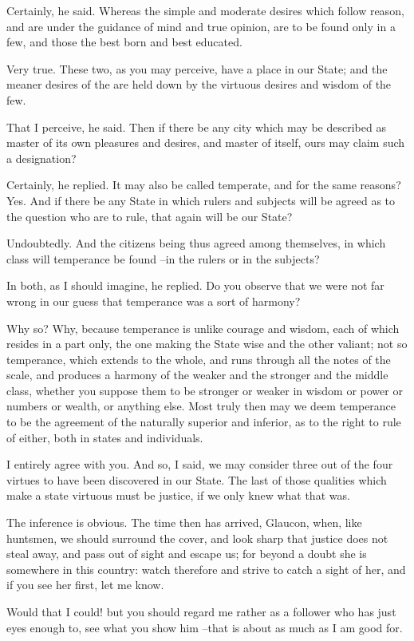 Certainly, he said.
Whereas the simple and moderate desires which follow reason, and are under the guidance of mind and true opinion, are to be found only in a few, and those the best born and best educated.

Very true. These two, as you may perceive, have a place in our State; and the meaner desires of the are held down by the virtuous desires and wisdom of the few.

That I perceive, he said.
Then if there be any city which may be described as master of its own pleasures and desires, and master of itself, ours may claim such a designation?

Certainly, he replied.
It may also be called temperate, and for the same reasons?
Yes.
And if there be any State in which rulers and subjects will be agreed as to the question who are to rule, that again will be our State?

Undoubtedly.
And the citizens being thus agreed among themselves, in which class will temperance be found --in the rulers or in the subjects?

In both, as I should imagine, he replied.
Do you observe that we were not far wrong in our guess that temperance was a sort of harmony?

Why so?
Why, because temperance is unlike courage and wisdom, each of which resides in a part only, the one making the State wise and the other valiant; not so temperance, which extends to the whole, and runs through all the notes of the scale, and produces a harmony of the weaker and the stronger and the middle class, whether you suppose them to be stronger or weaker in wisdom or power or numbers or wealth, or anything else. Most truly then may we deem temperance to be the agreement of the naturally superior and inferior, as to the right to rule of either, both in states and individuals.

I entirely agree with you.
And so, I said, we may consider three out of the four virtues to have been discovered in our State. The last of those qualities which make a state virtuous must be justice, if we only knew what that was.

The inference is obvious.
The time then has arrived, Glaucon, when, like huntsmen, we should surround the cover, and look sharp that justice does not steal away, and pass out of sight and escape us; for beyond a doubt she is somewhere in this country: watch therefore and strive to catch a sight of her, and if you see her first, let me know.

Would that I could! but you should regard me rather as a follower who has just eyes enough to, see what you show him --that is about as much as I am good for.

